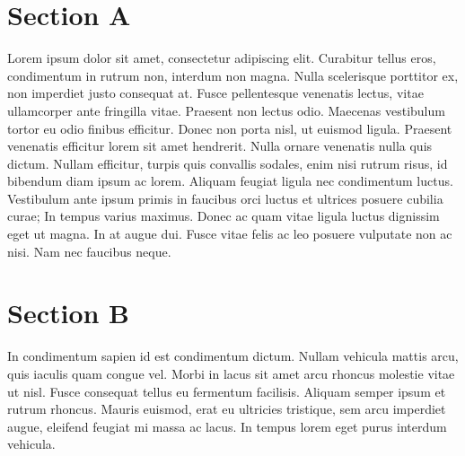 \documentclass[a5paper]{article}
\begin{document}
\begin{sloppypar}
\section*{Section A}

Lorem ipsum dolor sit amet, consectetur adipiscing elit. Curabitur tellus eros, condimentum in rutrum non, interdum non magna. Nulla scelerisque porttitor ex, non imperdiet justo consequat at. Fusce pellentesque venenatis lectus, vitae ullamcorper ante fringilla vitae. Praesent non lectus odio. Maecenas vestibulum tortor eu odio finibus efficitur. Donec non porta nisl, ut euismod ligula. Praesent venenatis efficitur lorem sit amet hendrerit. Nulla ornare venenatis nulla quis dictum. Nullam efficitur, turpis quis convallis sodales, enim nisi rutrum risus, id bibendum diam ipsum ac lorem. Aliquam feugiat ligula nec condimentum luctus. Vestibulum ante ipsum primis in faucibus orci luctus et ultrices posuere cubilia curae; In tempus varius maximus. Donec ac quam vitae ligula luctus dignissim eget ut magna. In at augue dui. Fusce vitae felis ac leo posuere vulputate non ac nisi. Nam nec faucibus neque.

\section*{Section B}
In condimentum sapien id est condimentum dictum. Nullam vehicula mattis arcu, quis iaculis quam congue vel. Morbi in lacus sit amet arcu rhoncus molestie vitae ut nisl. Fusce consequat tellus eu fermentum facilisis. Aliquam semper ipsum et rutrum rhoncus. Mauris euismod, erat eu ultricies tristique, sem arcu imperdiet augue, eleifend feugiat mi massa ac lacus. In tempus lorem eget purus interdum vehicula.

\end{sloppypar}
\end{document}
